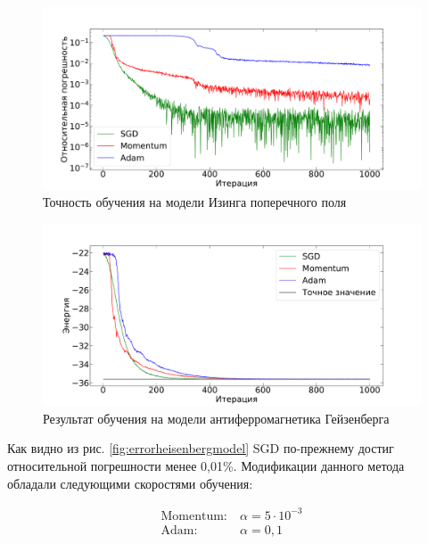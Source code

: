 \begin{figure}[t!]
    \centering
    \includegraphics[width=\linewidth]{pictures/error_ising_model}
    \caption[]{Точность обучения на модели Изинга поперечного поля}
    \label{fig:errorisingmodel}
\end{figure}

\begin{figure}[]
    \centering
    \includegraphics[width=\linewidth]{pictures/energy_heisenberg_model}
    \caption[]{Результат обучения на модели антиферромагнетика Гейзенберга}
    \label{fig:energyheisenbergmodel}
\end{figure}

Как видно из рис. \ref{fig:errorheisenbergmodel} SGD по-прежнему достиг относительной погрешности менее 0,01\%. 
Модификации данного метода обладали следующими скоростями обучения:

\begin{equation*}    
\begin{split}
\text{Momentum}:&\ \alpha=5\cdot 10^{-3}\\
\text{Adam}:&\ \alpha=0,1\\
\end{split}
\end{equation*}

